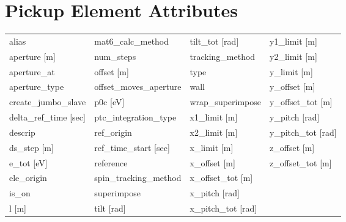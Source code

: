  \section{Pickup Element Attributes}
 \label{s:list.pickup}
 
 \begin{tabular}{llll} \toprule
alias                            & mat6_calc_method                 & tilt_tot [rad]                   & y1_limit [m]                     \\
aperture [m]                     & num_steps                        & tracking_method                  & y2_limit [m]                     \\
aperture_at                      & offset [m]                       & type                             & y_limit [m]                      \\
aperture_type                    & offset_moves_aperture            & wall                             & y_offset [m]                     \\
create_jumbo_slave               & p0c [eV]                         & wrap_superimpose                 & y_offset_tot [m]                 \\
delta_ref_time [sec]             & ptc_integration_type             & x1_limit [m]                     & y_pitch [rad]                    \\
descrip                          & ref_origin                       & x2_limit [m]                     & y_pitch_tot [rad]                \\
ds_step [m]                      & ref_time_start [sec]             & x_limit [m]                      & z_offset [m]                     \\
e_tot [eV]                       & reference                        & x_offset [m]                     & z_offset_tot [m]                 \\
ele_origin                       & spin_tracking_method             & x_offset_tot [m]                 &                                  \\
is_on                            & superimpose                      & x_pitch [rad]                    &                                  \\
l [m]                            & tilt [rad]                       & x_pitch_tot [rad]                &                                  \\
 \bottomrule
 \end{tabular}
 \vfill
 

